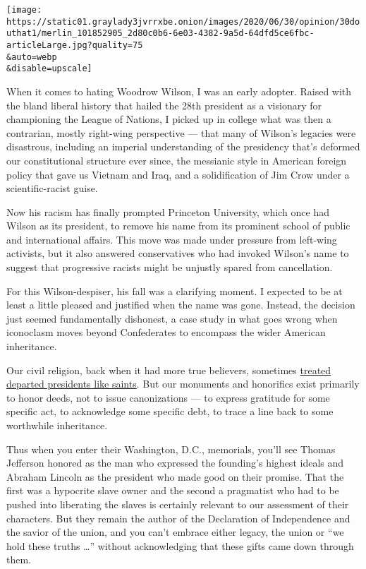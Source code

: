 \texttt{[image: https://static01.graylady3jvrrxbe.onion/images/2020/06/30/opinion/30douthat1/merlin\_101852905\_2d80c0b6-6e03-4382-9a5d-64dfd5ce6fbc-articleLarge.jpg?quality=75\\\&auto=webp\\\&disable=upscale]}

When it comes to hating Woodrow Wilson, I was an early adopter. Raised
with the bland liberal history that hailed the 28th president as a
visionary for championing the League of Nations, I picked up in college
what was then a contrarian, mostly right-wing perspective --- that many
of Wilson's legacies were disastrous, including an imperial
understanding of the presidency that's deformed our constitutional
structure ever since, the messianic style in American foreign policy
that gave us Vietnam and Iraq, and a solidification of Jim Crow under a
scientific-racist guise.

Now his racism has finally prompted Princeton University, which once had
Wilson as its president, to remove his name from its prominent school of
public and international affairs. This move was made under pressure from
left-wing activists, but it also answered conservatives who had invoked
Wilson's name to suggest that progressive racists might be unjustly
spared from cancellation.

For this Wilson-despiser, his fall was a clarifying moment. I expected
to be at least a little pleased and justified when the name was gone.
Instead, the decision just seemed fundamentally dishonest, a case study
in what goes wrong when iconoclasm moves beyond Confederates to
encompass the wider American inheritance.

Our civil religion, back when it had more true believers, sometimes
\href{https://en.wikipedia.org/wiki/The_Apotheosis_of_Washington}{treated
departed presidents like saints}. But our monuments and honorifics exist
primarily to honor deeds, not to issue canonizations --- to express
gratitude for some specific act, to acknowledge some specific debt, to
trace a line back to some worthwhile inheritance.

Thus when you enter their Washington, D.C., memorials, you'll see Thomas
Jefferson honored as the man who expressed the founding's highest ideals
and Abraham Lincoln as the president who made good on their promise.
That the first was a hypocrite slave owner and the second a pragmatist
who had to be pushed into liberating the slaves is certainly relevant to
our assessment of their characters. But they remain the author of the
Declaration of Independence and the savior of the union, and you can't
embrace either legacy, the union or ``we hold these truths \ldots{}''
without acknowledging that these gifts came down through them.

